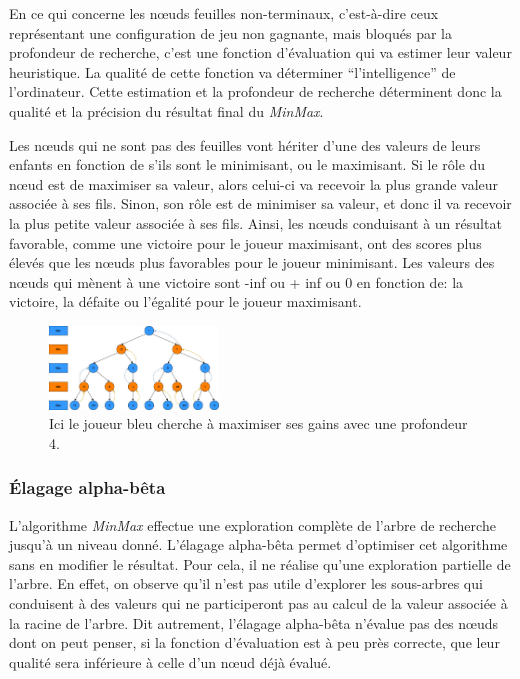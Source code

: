 En ce qui concerne les nœuds feuilles non-terminaux, c'est-à-dire ceux représentant une configuration de jeu non gagnante, mais bloqués par la 
profondeur de recherche, c'est une fonction d'évaluation qui va estimer leur valeur heuristique. La qualité de cette fonction va 
déterminer ``l'intelligence'' de l'ordinateur. Cette estimation et la profondeur de recherche déterminent donc la qualité et la 
précision du résultat final du \emph{MinMax}.

Les nœuds qui ne sont pas des feuilles vont hériter d'une des valeurs de leurs enfants en fonction de s'ils sont le minimisant, ou le maximisant.
Si le rôle du nœud est de maximiser sa valeur, alors celui-ci va recevoir la plus grande valeur associée à ses fils. Sinon, son rôle est de 
minimiser sa valeur, et donc il va recevoir la plus petite valeur associée à ses fils.
Ainsi, les nœuds conduisant à un résultat favorable, comme une victoire pour le joueur maximisant, ont des scores plus
élevés que les nœuds plus favorables pour le joueur minimisant. Les valeurs des nœuds qui mènent à une victoire sont -inf ou + inf ou 0 en fonction de:
la victoire, la défaite ou l'égalité pour le joueur maximisant. 


\begin{figure}[h]
    \begin{center}
        \includegraphics[width=0.4\textwidth]{root/MinMax.jpeg}
    \end{center}
    \caption{Ici le joueur bleu cherche à maximiser ses gains avec une profondeur 4.}\label{fig:min_max}
\end{figure}


\subsubsection{Élagage alpha-bêta}
L'algorithme \emph{MinMax} effectue une exploration complète de l'arbre de recherche jusqu'à un niveau donné. L'élagage alpha-bêta permet d'optimiser 
cet algorithme sans en modifier le résultat. Pour cela, il ne réalise qu'une exploration
partielle de l'arbre. En effet, on observe qu'il n'est pas utile d'explorer les sous-arbres qui conduisent à des valeurs
qui ne participeront pas au calcul de la valeur associée à la racine de l'arbre. Dit autrement, l'élagage alpha-bêta n'évalue pas des nœuds
dont on peut penser, si la fonction d'évaluation est à peu près correcte, que leur qualité sera inférieure à celle d'un nœud déjà évalué.

